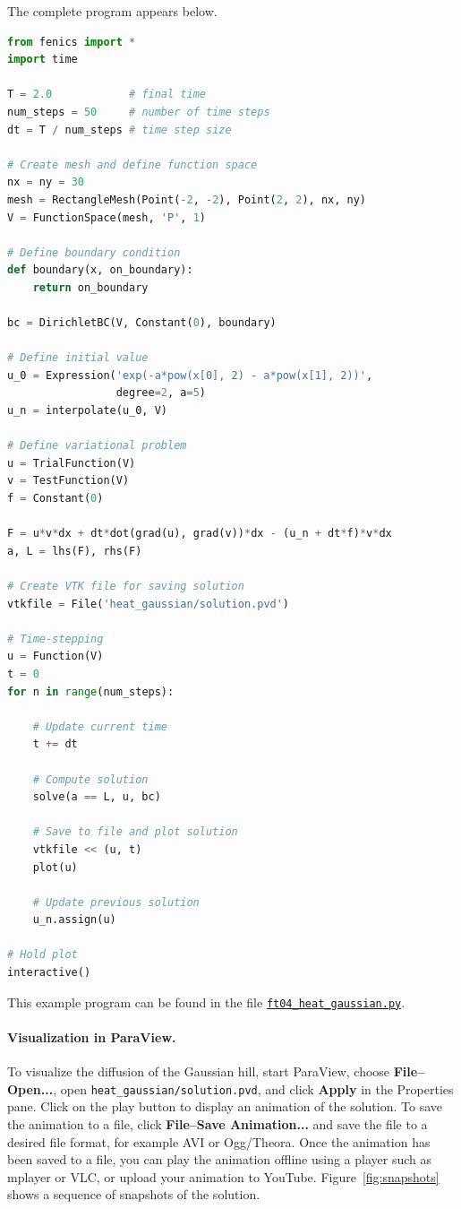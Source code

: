 \documentclass[graybox,envcountchap,sectrefs,final]{svmonodo}
\begin{document}

The complete program appears below.

\begin{lstlisting}[language=Python,style=graycolor]
from fenics import *
import time

T = 2.0            # final time
num_steps = 50     # number of time steps
dt = T / num_steps # time step size

# Create mesh and define function space
nx = ny = 30
mesh = RectangleMesh(Point(-2, -2), Point(2, 2), nx, ny)
V = FunctionSpace(mesh, 'P', 1)

# Define boundary condition
def boundary(x, on_boundary):
    return on_boundary

bc = DirichletBC(V, Constant(0), boundary)

# Define initial value
u_0 = Expression('exp(-a*pow(x[0], 2) - a*pow(x[1], 2))',
                 degree=2, a=5)
u_n = interpolate(u_0, V)

# Define variational problem
u = TrialFunction(V)
v = TestFunction(V)
f = Constant(0)

F = u*v*dx + dt*dot(grad(u), grad(v))*dx - (u_n + dt*f)*v*dx
a, L = lhs(F), rhs(F)

# Create VTK file for saving solution
vtkfile = File('heat_gaussian/solution.pvd')

# Time-stepping
u = Function(V)
t = 0
for n in range(num_steps):

    # Update current time
    t += dt

    # Compute solution
    solve(a == L, u, bc)

    # Save to file and plot solution
    vtkfile << (u, t)
    plot(u)

    # Update previous solution
    u_n.assign(u)

# Hold plot
interactive()
\end{lstlisting}
This example program can be found in the file \href{{https://fenicsproject.org/pub/tutorial/python/vol1/ft04_heat_gaussian.py}}{\nolinkurl{ft04_heat_gaussian.py}}.



\paragraph{Visualization in ParaView.}
To visualize the diffusion of the Gaussian hill, start ParaView,
choose \textbf{File--Open...}, open \Verb!heat_gaussian/solution.pvd!, and click
\textbf{Apply} in the Properties pane. Click on the play button to display
an animation of the solution. To save the animation to a file, click
\textbf{File--Save Animation...} and save the file to a desired file format,
for example AVI or Ogg/Theora.
Once the animation has been saved to a file, you can play the animation
offline using a player such as mplayer or VLC, or upload your
animation to YouTube. Figure~\ref{fig:snapshots} shows a sequence
of snapshots of the solution.
\end{document}
